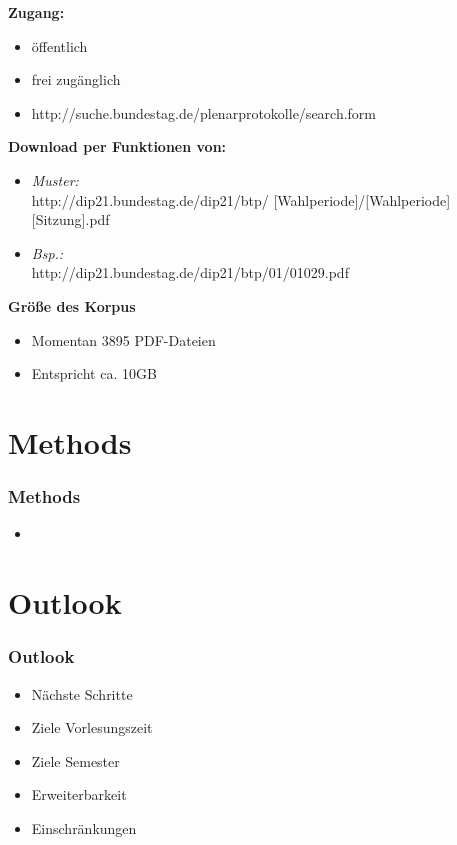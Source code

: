 \documentclass[11pt, a4paper]{beamer}
\begin{document}
\begin{frame}
\textbf{Zugang:}
\begin{itemize}
\item öffentlich
\item frei zugänglich
\item http://suche.bundestag.de/plenarprotokolle/search.form\\[1em]
\end{itemize}
\textbf{Download per Funktionen von:}
\begin{itemize}
\item \textit{Muster:}\\
http://dip21.bundestag.de/dip21/btp/ [Wahlperiode]/[Wahlperiode][Sitzung].pdf
\item \textit{Bsp.:}\\ http://dip21.bundestag.de/dip21/btp/01/01029.pdf\\[1em]
\end{itemize}
\textbf{Größe des Korpus}
\begin{itemize}
\item Momentan 3895 PDF-Dateien
\item Entspricht ca. 10GB
\end{itemize}
\end{frame}

\section{Methods}
\begin{frame}
\frametitle{Methods}
\begin{itemize}
\item 
\end{itemize}
\end{frame}

\section{Outlook}
\begin{frame}
\frametitle{Outlook}
\begin{itemize}
\item Nächste Schritte
\item Ziele Vorlesungszeit
\item Ziele Semester
\item Erweiterbarkeit
\item Einschränkungen
\end{itemize}
\end{frame}
\end{document}
